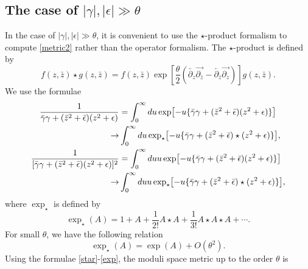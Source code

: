 \documentclass[a4paper,12pt]{article}
\begin{document}
\subsection{The case of $|\gamma|,|\epsilon| \gg \theta$}
In the case of $|\gamma|,|\epsilon| \gg \theta$, it is convenient to use the $\star$-product formalism to compute 
\eqref{metric2} rather than the operator formalism. The $\star$-product is defined by
\begin{equation}
f(z,\bar{z})\star g(z,\bar{z})=f(z,\bar{z})\exp\left[\frac{\theta}{2}
(\overleftarrow{\partial_z}\overrightarrow{\partial_{\bar{z}}}
-\overleftarrow{\partial_{\bar{z}}}\overrightarrow{\partial_z})\right]g(z,\bar{z}).
\end{equation}
We use the formulae
\begin{align}
\frac{1}{\bar{\gamma}\gamma+(\bar{z}^2+\bar{\epsilon})(z^2+\epsilon)}&=
\int_0^\infty du\exp\bigl[-u\{\bar{\gamma}\gamma+(\bar{z}^2+\bar{\epsilon})(z^2+\epsilon)\}\bigr]\notag\\
\rightarrow&\int_0^\infty du\exp_\star\bigl[-u\{\bar{\gamma}\gamma+(\bar{z}^2+\bar{\epsilon})\star(z^2+\epsilon)\}\bigr],
\label{star}\\
\frac{1}{[\bar{\gamma}\gamma+(\bar{z}^2+\bar{\epsilon})(z^2+\epsilon)]^2}&=
\int_0^\infty du u\exp\bigl[-u\{\bar{\gamma}\gamma+(\bar{z}^2+\bar{\epsilon})(z^2+\epsilon)\}\bigr]\notag\\
\rightarrow&\int_0^\infty du u\exp_\star\bigl[-u\{\bar{\gamma}\gamma+(\bar{z}^2+\bar{\epsilon})\star(z^2+\epsilon)\}\bigr],
\end{align}
where $\exp_\star$ is defined by
\begin{equation}
\exp_\star(A)=1+A+\frac{1}{2!}A\star A+\frac{1}{3!}A\star A\star A+\cdots.
\end{equation}
For small $\theta$, we have the following relation
\begin{equation}
\exp_\star(A)=\exp(A)+O(\theta^2).\label{exp}
\end{equation}
Using the formulae \eqref{star}-\eqref{exp}, the moduli space metric up to the order $\theta$ 
is
\end{document}
